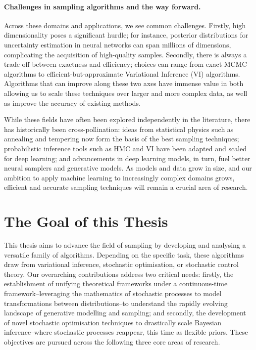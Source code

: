 
\paragraph{Challenges in sampling algorithms and the way forward.}{

Across these domains and applications, we see common challenges. Firstly, high dimensionality poses a significant hurdle; for instance, posterior distributions for uncertainty estimation in neural networks can span millions of dimensions, complicating the acquisition of high-quality samples. Secondly, there is always a trade-off between exactness and efficiency; choices can range from exact MCMC algorithms to efficient-but-approximate Variational Inference (VI) algorithms. Algorithms that can improve along these two axes have immense value in both allowing us to scale these techniques over larger and more complex data, as well as improve the accuracy of existing methods.

While these fields have often been explored independently in the literature, there has historically been cross-pollination: ideas from statistical physics such as annealing and tempering now form the basis of the best sampling techniques; probabilistic inference tools such as HMC and VI have been adapted and scaled for deep learning; and advancements in deep learning models, in turn, fuel better neural samplers and generative models. As models and data grow in size, and our ambition to apply machine learning to increasingly complex domains grows, efficient and accurate sampling techniques will remain a crucial area of research.
}

\section{The Goal of this Thesis}

This thesis aims to advance the field of sampling by developing and analysing a versatile family of algorithms. Depending on the specific task, these algorithms draw from variational inference, stochastic optimisation, or stochastic control theory. Our overarching contributions address two critical needs: firstly, the establishment of unifying theoretical frameworks under a continuous-time framework--leveraging the mathematics of stochastic processes to model transformations between distributions--to understand the rapidly evolving landscape of generative modelling and sampling; and secondly, the development of novel stochastic optimisation techniques to drastically scale Bayesian inference--where stochastic processes reappear, this time as flexible priors. These objectives are pursued across the following three core areas of research.

